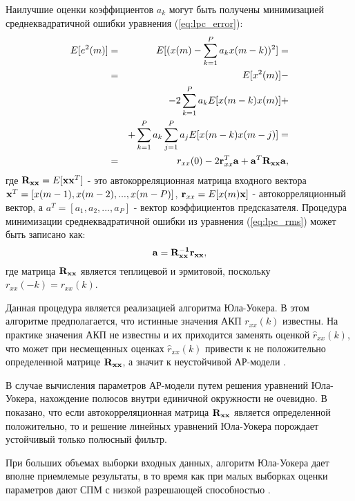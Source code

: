 Наилучшие оценки коэффициентов ${a_k}$ могут быть получены минимизацией среднеквадратичной ошибки уравнения \cite{saeed_book} (\ref{eq:lpc_error}):
\begin{eqnarray}
	\label{eq:lpc_rms}
		E[e^2(m)]	& = & E[(x(m) - \sum \limits_{k=1}^P a_k x(m-k))^2] =\nonumber \\
				& = & E[x^2(m)] - \nonumber \\
				& &  - 2\sum \limits_{k=1}^P a_k E[x(m-k)x(m)] + \nonumber \\
				& &  + \sum \limits_{k=1}^P a_k \sum \limits_{j=1}^P a_j E[x(m-k)x(m-j)] = \nonumber \\
				& = & r_{xx}(0) - 2{\bf r}^T_{xx}{\bf a} + {\bf a}^T {\bf R_{xx}a},
\end{eqnarray}
где ${{\bf R_{xx}} = E[{\bf xx}^T]}$ - это автокорреляционная матрица входного вектора \\
${{\bf x}^T=[x(m-1),x(m-2),...,x(m-P)]}$,
${{\bf r}_{xx}=E[x(m){\bf x}]}$ - автокорреляционный вектор, а ${a^T=[a_1,a_2,...,a_P]}$ -  вектор коэффициентов предсказателя.
Процедура минимизации среднеквадратичной ошибки из уравнения (\ref{eq:lpc_rms}) может быть записано как:
\begin{equation}
	\label{eq:lpc_rms2}
	{\bf a=R^{-1}_{xx}r_{xx}},
\end{equation}
где матрица ${\bf R_{xx}}$ является теплицевой и эрмитовой, поскольку  ${r_{xx}(-k) = r_{xx}(k)}$.

Данная процедура является реализацией алгоритма Юла-Уокера. В этом алгоритме предполагается, что истинные значения
АКП ${r_{xx}(k)}$ известны. На практике значения АКП не известны и их приходится заменять оценкой ${\hat{r}_{xx}(k)}$, что может
при несмещенных оценках ${\hat{r}_{xx}(k)}$ привести к не положительно определенной матрице ${\bf {R_{xx}}}$, а значит
к неустойчивой \mbox{АР-модели} \cite{bolshakov-book}.

В случае вычисления параметров АР-модели путем решения уравнений Юла-Уокера, нахождение полюсов
внутри единичной окружности не очевидно. В \cite{shahtarin-spectrum-book} показано, что если
автокорреляционная матрица  ${{\bf R_{xx}}}$ является определенной положительно, то и решение
линейных уравнений Юла-Уокера порождает устойчивый только полюсный фильтр.

При больших объемах выборки входных данных, алгоритм Юла-Уокера дает вполне приемлемые результаты, в то время
как при малых выборках оценки параметров дают СПМ с низкой разрешающей способностью \cite{marpl_book, bolshakov-book}.

